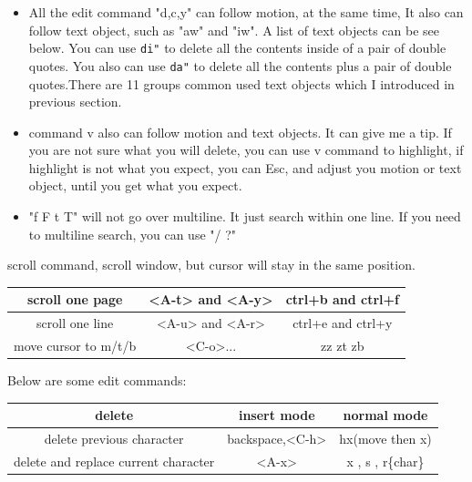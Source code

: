 \documentclass[a4paper,12pt,twoside]{book}
\begin{document}
\begin{itemize}
\begin{center}
\begin{itemize}
				
				\item All the edit command "d,c,y" can follow motion, at the same time, It also can follow text object, such as "aw" and "iw". A list of text objects can be see below.  You can use \verb=di"= to delete all the contents inside of a pair of double quotes. You also can use \verb=da"= to delete all the contents plus a pair of double quotes.There are 11 groups common used text objects which I introduced in previous section. 
						
				\item command v also can follow motion and text objects. It can give me a tip. If you are not sure what you will delete, you can use v command to highlight, if highlight is not what you expect, you can Esc, and adjust you motion or text object, until you get what you expect. 

				\item "f F t T" will not go over multiline. It just search within one line. If you need to multiline search, you can use "/ ?" 
		\end{itemize}

 scroll command, scroll window, but cursor will stay in the same position.

 
 \begin{tabular}{c|c|c}
        \hline
        scroll one  page &  <A-t> and <A-y>  & ctrl+b and  ctrl+f    \\
        
        \hline 		  
        scroll one line &  <A-u> and <A-r>  & ctrl+e and ctrl+y \\
        
         \hline 		  
        move cursor to m/t/b & <C-o>...    & zz zt zb \\

    \end{tabular}
\end{center}
 
Below are some edit commands:
\begin{center}
		\begin{tabular}{c|c|c}
		\hline
		delete & insert mode & normal mode\\

   	    \hline 
		delete previous character & backspace,<C-h> & hx(move then x)  \\
		
	
		\hline 
		delete and replace current character & <A-x> & x , s , r\{char\}  \\
	

\end{tabular}
\end{center}
\end{itemize}
\end{document}
